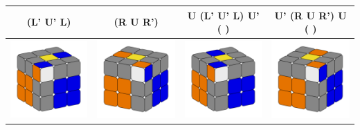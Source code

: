 \documentclass[12pt, a3paper]{article}
\newcommand{\scale}{1}
\begin{document}
\begin{center}
\begin{longtable}{c|c||c|c}
	(L' U' L) & (R U R') & U (L' U' L) U' ( ) & U' (R U R') U ( ) \\
	\hline
	\includegraphics[scale=\scale]{5_left} & \includegraphics[scale=\scale]{5_right}  &  \includegraphics[scale=\scale]{6_left} & \includegraphics[scale=\scale]{6_right} \\

\end{longtable}
\end{center}
\end{document}
